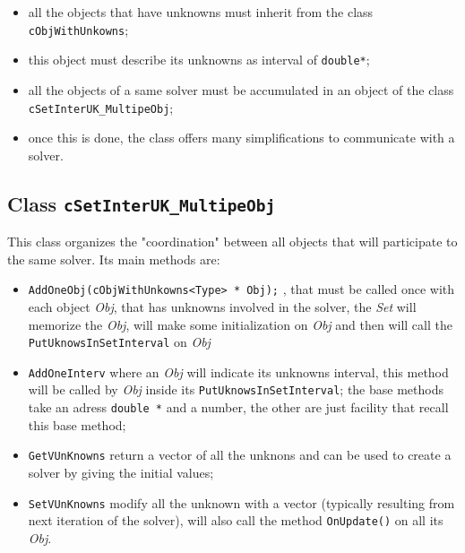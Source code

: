 \begin{itemize}
     \item all the objects that have unknowns must inherit from the class {\tt cObjWithUnkowns};

     \item this object must describe its unknowns as interval of {\tt double*};

     \item  all the objects of a same solver must be accumulated in an object of the class
            {\tt cSetInterUK\_MultipeObj};

      \item once this is done, the class offers many simplifications to communicate with a solver.
     
\end{itemize}


\subsection{Class {\tt cSetInterUK\_MultipeObj}}

This class organizes the "coordination" between all objects that will participate to the same solver.
Its main methods are:

\label{cSetIUK}

\begin{itemize}
    \item  {\tt  AddOneObj(cObjWithUnkowns<Type> * Obj);} , that must be called once with each object \emph{Obj},
           that has unknowns involved in the solver, the \emph{Set} will memorize the \emph{Obj},
           will make some initialization on  \emph{Obj} and then will call    the
           {\tt PutUknowsInSetInterval} on  \emph{Obj} 

    \item  {\tt  AddOneInterv} where an \emph{Obj}  will indicate its unknowns interval,
          this method will be  called by  \emph{Obj} inside its {\tt PutUknowsInSetInterval};
          the base methods take an adress {\tt double *} and a number, the other are
          just facility that recall this base method;
          
    \item  {\tt GetVUnKnowns}  return a vector of all the unknons and can be used to create a solver
           by giving the initial values;

    \item  {\tt SetVUnKnowns}  modify all the unknown with a vector (typically resulting from
           next iteration of the solver), will also call the method {\tt OnUpdate()} on all its \emph{Obj}.
\end{itemize}



